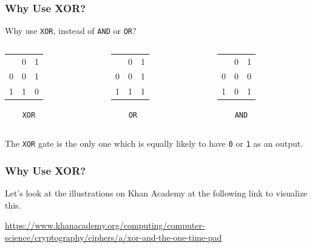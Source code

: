 \documentclass{beamer}
\newcommand{\<}{\langle}
\renewcommand{\>}{\rangle}
\begin{document}
\begin{frame}[fragile]
\frametitle{Why Use XOR?}

Why use \verb|XOR|, instead of \verb|AND| or \verb|OR|?\newline

\begin{columns}
\begin{column}{.3\textwidth}
\begin{tabular}{ r|c|c| }
\multicolumn{1}{r}{}
 &  \multicolumn{1}{c}{0}
 & \multicolumn{1}{c}{1} \\
\cline{2-3}
0 &  0&  1\\
\cline{2-3}
1 & 1&0 \\
\cline{2-3}
\end{tabular}\newline

\verb|    XOR|
\end{column}
\begin{column}{.3\textwidth}
\begin{tabular}{ r|c|c| }
\multicolumn{1}{r}{}
 &  \multicolumn{1}{c}{0}
 & \multicolumn{1}{c}{1} \\
\cline{2-3}
0 &  0&  1\\
\cline{2-3}
1 &1 & 1\\
\cline{2-3}
\end{tabular}\newline

\verb|    OR|
\end{column}
\begin{column}{.3\textwidth}
\begin{tabular}{ r|c|c| }
\multicolumn{1}{r}{}
 &  \multicolumn{1}{c}{0}
 & \multicolumn{1}{c}{1} \\
\cline{2-3}
0 &  0& 0 \\
\cline{2-3}
1 &0 & 1\\
\cline{2-3}
\end{tabular}\newline

\verb|    AND|
\end{column}
\end{columns}
\vspace{5mm}

The \verb|XOR| gate is the only one which is equally likely to have \verb|0| or \verb|1| as an output. 
\end{frame}


\begin{frame}
\frametitle{Why Use XOR?}
Let's look at the illustrations on Khan Academy at the following link to visualize this.\newline

\url{https://www.khanacademy.org/computing/computer-science/cryptography/ciphers/a/xor-and-the-one-time-pad}
\end{frame}
\end{document}

